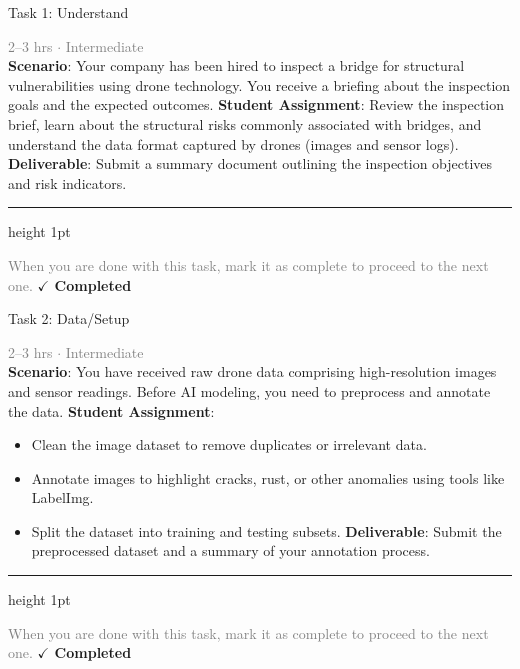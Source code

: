 \documentclass[10pt,a4paper]{article}
\begin{document}
\begin{taskbox}{Task 1: Understand}

    {\small \textcolor{gray}{2--3 hrs $\cdot$ Intermediate}}\\[12pt]

    \textbf{Scenario}: Your company has been hired to inspect a bridge for structural vulnerabilities using drone technology. You receive a briefing about the inspection goals and the expected outcomes.  
\textbf{Student Assignment}: Review the inspection brief, learn about the structural risks commonly associated with bridges, and understand the data format captured by drones (images and sensor logs).  
\textbf{Deliverable}: Submit a summary document outlining the inspection objectives and risk indicators.\par

    \vspace{16pt}

    \textcolor{cardBorder}{\hrule height 1pt}\vspace{8pt}

    \small \textcolor{gray}{When you are done with this task, mark it as complete to proceed to the next one.} \hfill \textbf{\textcolor{brandDark}{$\checkmark$ Completed}}

\end{taskbox}

\begin{taskbox}{Task 2: Data/Setup}

    {\small \textcolor{gray}{2--3 hrs $\cdot$ Intermediate}}\\[12pt]

    \textbf{Scenario}: You have received raw drone data comprising high-resolution images and sensor readings. Before AI modeling, you need to preprocess and annotate the data.  
\textbf{Student Assignment}:  
\begin{itemize}
    \item Clean the image dataset to remove duplicates or irrelevant data.  
    \item Annotate images to highlight cracks, rust, or other anomalies using tools like LabelImg.  
    \item Split the dataset into training and testing subsets.  
\textbf{Deliverable}: Submit the preprocessed dataset and a summary of your annotation process.\par
\end{itemize}

    \vspace{16pt}

    \textcolor{cardBorder}{\hrule height 1pt}\vspace{8pt}

    \small \textcolor{gray}{When you are done with this task, mark it as complete to proceed to the next one.} \hfill \textbf{\textcolor{brandDark}{$\checkmark$ Completed}}

\end{taskbox}
\end{document}
